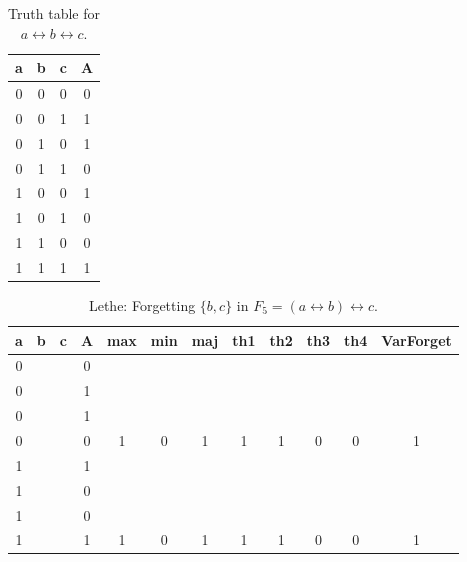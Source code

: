 \begin{table}[!tb]
    \centering
    \begin{tabular}{|c|c|c|c|}
        \hline
        \textbf{a} & \textbf{b} & \textbf{c} & \textbf{A} \\ \hline
        0 & 0 & 0 & 0 \\ \hline
        0 & 0 & 1 & 1 \\ \hline
        0 & 1 & 0 & 1 \\ \hline
        0 & 1 & 1 & 0 \\ \hline
        1 & 0 & 0 & 1 \\ \hline
        1 & 0 & 1 & 0 \\ \hline
        1 & 1 & 0 & 0 \\ \hline
        1 & 1 & 1 & 1 \\ \hline
    \end{tabular}
    \caption{Truth table for $a \leftrightarrow b \leftrightarrow c$.}
    \label{tab:truthtab}
\end{table}

\begin{table}[!tb]
    \centering
    \begin{tabular}{|c|c|c|c|c|c|c|c|c|c|c|c|}
        \hline
        \textbf{a} & \textbf{b} & \textbf{c} & \textbf{A} & \textbf{max} & \textbf{min} & \textbf{maj} & \textbf{th1} & \textbf{th2} & \textbf{th3} & \textbf{th4} & \textbf{VarForget} \\ \hline
        \rowcolor{gray!40} 0 &  &  & 0 &  &  &  &  &  &  &  &  \\ \hline
        \rowcolor{gray!40} 0 &  &  & 1 &  &  &  &  &  &  &  &  \\ \hline
        \rowcolor{gray!40} 0 &  &  & 1 &  &  &  &  &  &  &  &  \\ \hline
        \rowcolor{gray!40} 0 &  &  & 0 & 1 & 0 & 1 & 1 & 1 & 0 & 0 & 1 \\ \hline
        \rowcolor{blue!40} 1 &  &  & 1 &  &  &  &  &  &  &  &  \\ \hline
        \rowcolor{blue!40} 1 &  &  & 0 &  &  &  &  &  &  &  &  \\ \hline
        \rowcolor{blue!40} 1 &  &  & 0 &  &  &  &  &  &  &  &  \\ \hline
        \rowcolor{blue!40} 1 &  &  & 1 & 1 & 0 & 1 & 1 & 1 & 0 & 0 & 1 \\ \hline
    \end{tabular}
    \caption{Lethe: Forgetting $\{b, c\}$ in $F_{5} = (a \leftrightarrow b) \leftrightarrow c$.}
    \label{tab:lethe-F5-bc}
\end{table}
